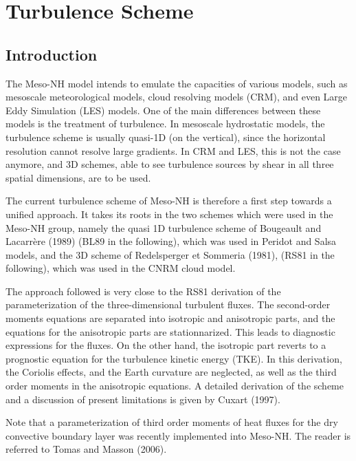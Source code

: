 \chapter{Turbulence Scheme}
\minitoc


\section{Introduction}

The Meso-NH model intends to emulate the capacities of various
models, such as mesoscale meteorological models, cloud resolving models (CRM),
and even Large Eddy Simulation (LES) models. One of the main differences
between these models is the treatment of turbulence.
In mesoscale hydrostatic models, the turbulence scheme is usually quasi-1D
(on the vertical), since the horizontal resolution
 cannot resolve large gradients. In CRM and LES,
this is not the case anymore, and
 3D schemes, able to see turbulence sources by shear in all three spatial
dimensions, are to be used.


The current turbulence scheme of Meso-NH is therefore a first step towards a
unified approach. It takes its roots in the two schemes which were used in
the Meso-NH group, namely the quasi 1D turbulence scheme of
Bougeault and Lacarr\`ere (1989) (BL89 in the following), which was used in
Peridot and Salsa models, and the 3D scheme of Redelsperger et Sommeria (1981),
(RS81 in the following), which was used in the CNRM cloud model.


The approach followed is very close to the RS81 derivation of the
parameterization of the three-dimensional turbulent fluxes. The second-order
moments equations are separated into isotropic and anisotropic parts,
and the equations for the anisotropic parts are stationnarized. This leads
to diagnostic expressions for the fluxes. On the other hand,
the isotropic part reverts to a prognostic equation for the turbulence
kinetic energy (TKE). In this derivation, the Coriolis effects, and the Earth
curvature are neglected, as well as the third order moments in the
anisotropic equations. A detailed derivation of the scheme and a discussion
of present limitations is given by Cuxart (1997).

Note that a parameterization  of third order moments of heat fluxes
for the dry convective boundary layer was recently implemented into Meso-NH.
The reader is referred to Tomas and Masson (2006).


